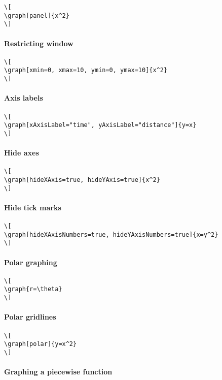 \documentclass{ximera}
\begin{document}
  
\begin{verbatim}
\[
\graph[panel]{x^2}
\]
\end{verbatim}
\paragraph{Restricting window}

  
\begin{verbatim}
\[
\graph[xmin=0, xmax=10, ymin=0, ymax=10]{x^2}
\]
\end{verbatim}
\paragraph{Axis labels}

  
\begin{verbatim}
\[
\graph[xAxisLabel="time", yAxisLabel="distance"]{y=x}
\]
\end{verbatim}
\paragraph{Hide axes}

  
\begin{verbatim}
\[
\graph[hideXAxis=true, hideYAxis=true]{x^2}
\]
\end{verbatim}
\paragraph{Hide tick marks}

  
\begin{verbatim}
\[
\graph[hideXAxisNumbers=true, hideYAxisNumbers=true]{x=y^2}
\]
\end{verbatim}
\paragraph{Polar graphing}

  
\begin{verbatim}
\[
\graph{r=\theta}
\]
\end{verbatim}
\paragraph{Polar gridlines}


\begin{verbatim}
\[
\graph[polar]{y=x^2}
\]
\end{verbatim}
\paragraph{Graphing a piecewise function}
\end{document}
